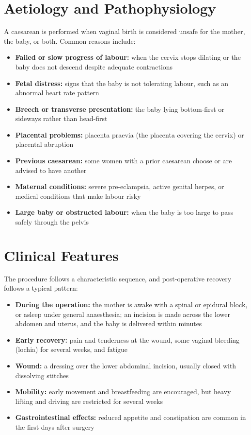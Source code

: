 \section*{Aetiology and Pathophysiology}
A caesarean is performed when vaginal birth is considered unsafe for the mother, the baby, or both. Common reasons include:
\begin{itemize}
    \item \textbf{Failed or slow progress of labour:} when the cervix stops dilating or the baby does not descend despite adequate contractions
    \item \textbf{Fetal distress:} signs that the baby is not tolerating labour, such as an abnormal heart rate pattern
    \item \textbf{Breech or transverse presentation:} the baby lying bottom-first or sideways rather than head-first
    \item \textbf{Placental problems:} placenta praevia (the placenta covering the cervix) or placental abruption
    \item \textbf{Previous caesarean:} some women with a prior caesarean choose or are advised to have another
    \item \textbf{Maternal conditions:} severe pre-eclampsia, active genital herpes, or medical conditions that make labour risky
    \item \textbf{Large baby or obstructed labour:} when the baby is too large to pass safely through the pelvis
\end{itemize}

\section*{Clinical Features}
The procedure follows a characteristic sequence, and post-operative recovery follows a typical pattern:
\begin{itemize}
    \item \textbf{During the operation:} the mother is awake with a spinal or epidural block, or asleep under general anaesthesia; an incision is made across the lower abdomen and uterus, and the baby is delivered within minutes
    \item \textbf{Early recovery:} pain and tenderness at the wound, some vaginal bleeding (lochia) for several weeks, and fatigue
    \item \textbf{Wound:} a dressing over the lower abdominal incision, usually closed with dissolving stitches
    \item \textbf{Mobility:} early movement and breastfeeding are encouraged, but heavy lifting and driving are restricted for several weeks
    \item \textbf{Gastrointestinal effects:} reduced appetite and constipation are common in the first days after surgery
\end{itemize}

